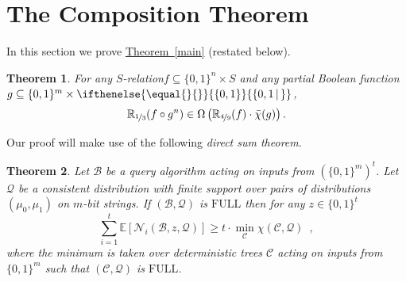 \documentclass[11pt]{article}
\numberwithin{equation}{section}
\newtheorem{theorem}{Theorem}[section]
\theoremstyle{definition}
\theoremstyle{plain}
\newcommand{\R}{\mathbb R}
\newcommand{\expref}[2]{\hyperref[#2]{#1~\ref{#2}}}
\newcommand{\relation}{$S$-relation\xspace}     %
\newcommand{\md}{\middle}
\newcommand{\dr}{\nicefrac}
\newcommand{\set}[2][]{\ifthenelse{\equal{}{#1}}%
{\ensuremath{\left\{#2\right\}}}%
{\ensuremath{\left\{#2\,\md|\,#1\right\}}}}
\newcommand{\OI}{\set{0,1}}
\newcommand{\full}{\text{FULL}}
\newcommand{\clB}{\mathcal{B}}
\newcommand{\clC}{\mathcal{C}}
\newcommand{\clQ}{\mathcal{Q}}
\newcommand{\clN}{\mathcal{N}}
\newcommand{\E}{\mathbb{E}}
\begin{document}
\section{The Composition Theorem}
\label{comp}
In this section we prove \expref{Theorem}{main} (restated below).
\begin{theorem}
\label{main-restated}
For any \relation $f\subseteq\{0,1\}^n \times S$ and any partial Boolean function
%
$g\subseteq \{0,1\}^m \times \OI$,
\[\R_{\dr13}(f \circ g^n) \in \Omega\left(\R_{\dr49}(f) \cdot \bar \chi(g)\right).\]
\end{theorem}
Our proof will make use of the following \emph{direct sum theorem}.
\begin{theorem}
\label{dp}
Let $\clB$ be a query algorithm acting on inputs from $\left(\{0,1\}^m\right)^t$.  Let $\clQ$ be a consistent distribution with finite support over pairs of distributions $(\mu_0, \mu_1)$ on $m$-bit strings.  If $(\clB, \clQ)$ is $\full$ then for any 
$z \in \{0,1\}^t$
\[
\sum_{i=1}^t \E[\clN_i(\clB, z,\clQ)] \geq t \cdot \min_{\clC} \chi(\clC, \clQ) \enspace,
\]
where the minimum is taken over deterministic trees $\clC$ acting on inputs from $\{0,1\}^m$ such that $(\clC, \clQ)$ is $\full$.
\end{theorem}
\end{document}
